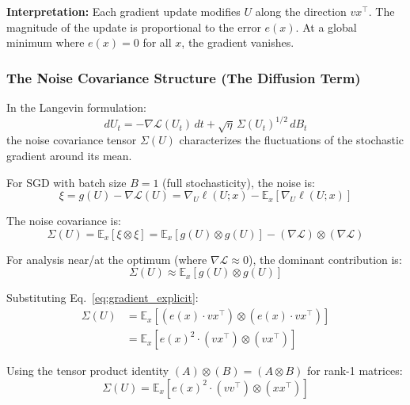 \documentclass[
  journal=largetwo,
  year=2025,
  volume=37,
]{cup-journal}
\begin{document}
\textbf{Interpretation:} Each gradient update modifies $U$ along the direction $v x^\top$. The magnitude of the update is proportional to the error $e(x)$. At a global minimum where $e(x) = 0$ for all $x$, the gradient vanishes.

\subsubsection{The Noise Covariance Structure (The Diffusion Term)}

In the Langevin formulation:
\begin{equation}
    dU_t = -\nabla \mathcal{L}(U_t) \, dt + \sqrt{\eta} \, \Sigma(U_t)^{1/2} \, dB_t
\end{equation}
the noise covariance tensor $\Sigma(U)$ characterizes the fluctuations of the stochastic gradient around its mean.

For SGD with batch size $B=1$ (full stochasticity), the noise is:
\begin{equation}
    \xi = g(U) - \nabla \mathcal{L}(U) = \nabla_U \ell(U; x) - \mathbb{E}_x[\nabla_U \ell(U; x)]
\end{equation}

The noise covariance is:
\begin{equation}
    \Sigma(U) = \mathbb{E}_x[\xi \otimes \xi] = \mathbb{E}_x[g(U) \otimes g(U)] - (\nabla \mathcal{L}) \otimes (\nabla \mathcal{L})
\end{equation}

For analysis near/at the optimum (where $\nabla \mathcal{L} \approx 0$), the dominant contribution is:
\begin{equation}
    \Sigma(U) \approx \mathbb{E}_x[g(U) \otimes g(U)]
\end{equation}

Substituting Eq.~\eqref{eq:gradient_explicit}:
\begin{align}
    \Sigma(U) &= \mathbb{E}_x \left[ \left( e(x) \cdot v x^\top \right) \otimes \left( e(x) \cdot v x^\top \right) \right] \nonumber \\
    &= \mathbb{E}_x \left[ e(x)^2 \cdot (v x^\top) \otimes (v x^\top) \right]
\end{align}

Using the tensor product identity $(A) \otimes (B) = (A \otimes B)$ for rank-1 matrices:
\begin{equation}\label{eq:sigma_tensor}
    \boxed{\Sigma(U) = \mathbb{E}_x \left[ e(x)^2 \cdot (v v^\top) \otimes (x x^\top) \right]}
\end{equation}
\end{document}
